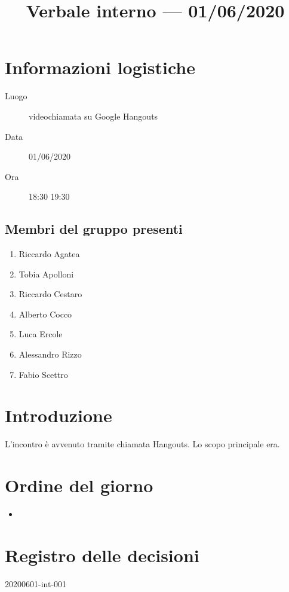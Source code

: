 \documentclass{article}
\title{Verbale interno --- 01/06/2020}
\begin{document}


\section{Informazioni logistiche}%
\label{sec:informazioni_logistiche}

\begin{description}
  \item [Luogo] videochiamata su Google Hangouts
  \item [Data] 01/06/2020
  \item [Ora] 18:30  19:30
\end{description}

\subsection{Membri del gruppo presenti}%
\label{sub:membri_del_gruppo_presenti}

\begin{enumerate}
  \item Riccardo Agatea
  \item Tobia Apolloni
  \item Riccardo Cestaro
  \item Alberto Cocco
  \item Luca Ercole
  \item Alessandro Rizzo
  \item Fabio Scettro
\end{enumerate}

\section{Introduzione}%
\label{sec:introduzione}
L'incontro è avvenuto tramite chiamata Hangouts.
Lo scopo principale era.

\section{Ordine del giorno}%
\label{sec:ordine_del_giorno}

\begin{itemize}
  \item %
\end{itemize}

\section{}%
\label{sec:}

\newpage
\section{Registro delle decisioni}%
\label{sec:registro_delle_decisioni}

\begin{description}
  \item[20200601-int-001] %
\end{description}

\end{document}
